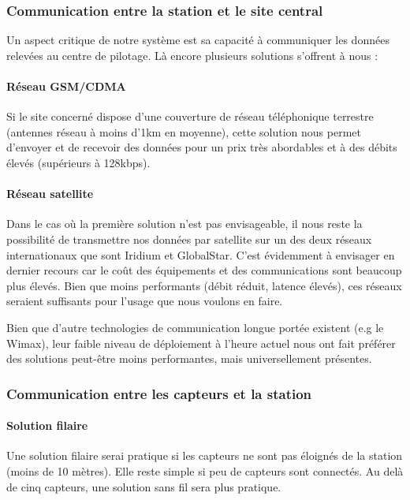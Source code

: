 \subsubsection{Communication entre la station et le site central}

Un aspect critique de notre système est sa capacité à communiquer les données relevées au centre de pilotage. Là encore plusieurs solutions s'offrent à nous :

\paragraph{Réseau GSM/CDMA}

Si le site concerné dispose d'une couverture de réseau téléphonique terrestre (antennes réseau à moins d'1km en moyenne), cette solution nous permet d'envoyer et de recevoir des données pour un prix très abordables et à des débits élevés (supérieurs à 128kbps).

\paragraph{Réseau satellite}

Dans le cas où la première solution n'est pas envisageable, il nous reste la possibilité de transmettre nos données par satellite sur un des deux réseaux internationaux que sont Iridium et GlobalStar. C'est évidemment à envisager en dernier recours car le coût des équipements et des communications sont beaucoup plus élevés. Bien que moins performants (débit réduit, latence élevés), ces réseaux seraient suffisants pour l'usage que nous voulons en faire.

Bien que d'autre technologies de communication longue portée existent (e.g le Wimax), leur faible niveau de déploiement à l'heure actuel nous ont fait préférer des solutions peut-être moins performantes, mais universellement présentes.

\subsubsection{Communication entre les capteurs et la station}

\paragraph{Solution filaire}
Une solution filaire serai pratique si les capteurs ne sont pas éloignés de la station (moins de 10 mètres). Elle reste simple si peu de capteurs sont connectés.
Au delà de cinq capteurs, une solution sans fil sera plus pratique.\\

